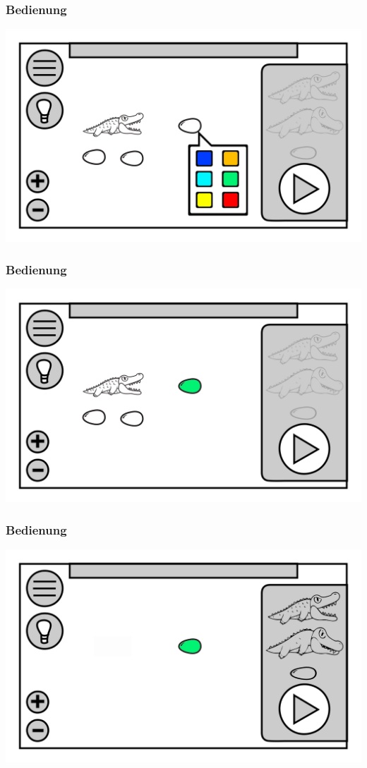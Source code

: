 \documentclass[t]{beamer}
\begin{document}
\begin{frame}
	\frametitle{Bedienung}
	\includegraphics[height=\textheight]{level_color.png}
\end{frame}
\begin{frame}
	\frametitle{Bedienung}
	\includegraphics[height=\textheight]{level_colored_egg.png}
\end{frame}
\begin{frame}
	\frametitle{Bedienung}
	\includegraphics[height=\textheight]{level_start.png}
\end{frame}
\end{document}
